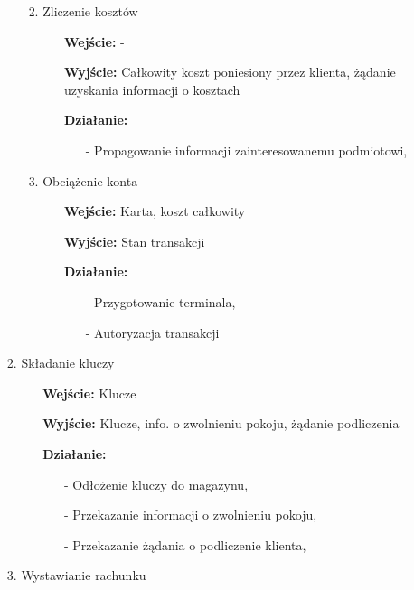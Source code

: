 \documentclass[a4paper, 11pt]{article}
\begin{document}
\begin{enumerate}[label*=\arabic*.]
\begin{enumerate}[label*=\arabic*.]
\begin{enumerate}[label*=\arabic*.]
\begin{enumerate}[label*=\arabic*.]
\begin{itemize}
\begin{itemize}
						\end{itemize}
					\end{itemize}
					\item Zliczenie kosztów
					\begin{itemize}
						\item [\textbf{Wejście:}] -
						\item [\textbf{Wyjście:}] Całkowity koszt poniesiony przez klienta, żądanie uzyskania informacji o kosztach
						\item [\textbf{Działanie:}] 
						\begin{itemize}
							\item[-] Propagowanie informacji zainteresowanemu podmiotowi,
						\end{itemize}
					\end{itemize}
					\item Obciążenie konta
					\begin{itemize}
						\item [\textbf{Wejście:}] Karta, koszt całkowity
						\item [\textbf{Wyjście:}] Stan transakcji
						\item [\textbf{Działanie:}] 
						\begin{itemize}
							\item[-] Przygotowanie terminala,
							\item[-] Autoryzacja transakcji
						\end{itemize}
					\end{itemize}
				\end{enumerate}													
				\item Składanie kluczy
				\begin{itemize}
					\item [\textbf{Wejście:}] Klucze
					\item [\textbf{Wyjście:}] Klucze, info. o zwolnieniu pokoju, żądanie podliczenia
					\item [\textbf{Działanie:}] 
					\begin{itemize}
						\item[-] Odłożenie kluczy do magazynu,
						\item[-] Przekazanie informacji o zwolnieniu pokoju,
						\item[-] Przekazanie żądania o podliczenie klienta,
					\end{itemize}
				\end{itemize}
				\item Wystawianie rachunku
				\begin{itemize}

\end{itemize}
\end{enumerate}
\end{enumerate}
\end{enumerate}
\end{document}
